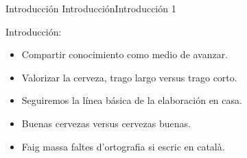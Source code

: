 \begin{frame}
\end{frame}

\begin{frame}{Introducción}
\protect\hypertarget{introducciuxf3n}{}
IntroducciónIntroducción 1

Introducción:

\begin{itemize}
\item
  Compartir conocimiento como medio de avanzar.
\item
  Valorizar la cerveza, trago largo versus trago corto.
\item
  Seguiremos la línea básica de la elaboración en casa.
\item
  Buenas cervezas versus cervezas buenas.
\item
  Faig massa faltes d'ortografia si escric en català.
\end{itemize}
\end{frame}


